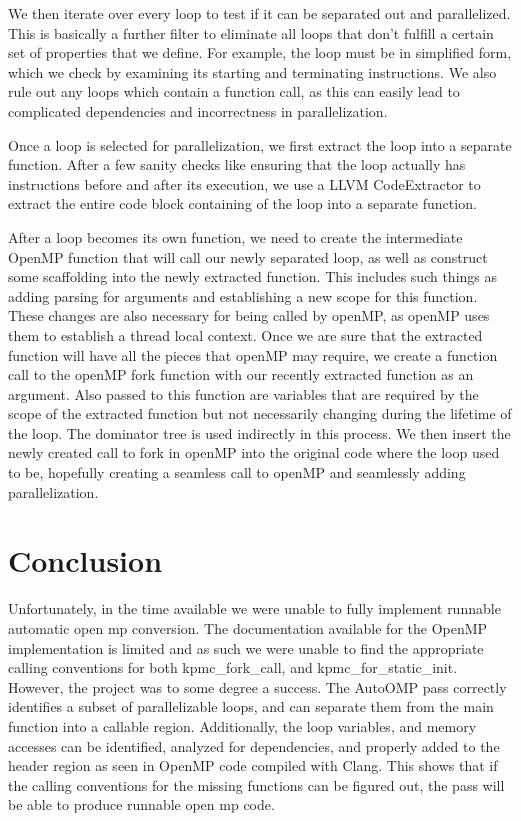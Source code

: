 \documentclass[conference]{IEEEtran}
\begin{document}
We then iterate over every loop to test if it can be separated out and
parallelized. This is basically a further filter to eliminate all
loops that don't fulfill a certain set of properties that we
define. For example, the loop must be in simplified form, which we
check by examining its starting and terminating instructions. We also
rule out any loops which contain a function call, as this can easily
lead to complicated dependencies and incorrectness in parallelization.

Once a loop is selected for parallelization, we first extract the loop
into a separate function. After a few sanity checks like ensuring that
the loop actually has instructions before and after its execution, we
use a LLVM CodeExtractor to extract the entire code block containing
of the loop into a separate function.

After a loop becomes its own function, we need to create the
intermediate OpenMP function that will call our newly separated loop,
as well as construct some scaffolding into the newly extracted
function. This includes such things as adding parsing for arguments
and establishing a new scope for this function. These changes are also
necessary for being called by openMP, as openMP uses them to establish
a thread local context. Once we are sure that the extracted function
will have all the pieces that openMP may require, we create a function
call to the openMP fork function with our recently extracted function
as an argument. Also passed to this function are variables that are
required by the scope of the extracted function but not necessarily
changing during the lifetime of the loop. The dominator tree is used
indirectly in this process. We then insert the newly created call to
fork in openMP into the original code where the loop used to be,
hopefully creating a seamless call to openMP and seamlessly adding
parallelization.




\section{Conclusion}

Unfortunately, in the time available we were unable to fully implement runnable automatic
open mp conversion. The documentation available for the OpenMP implementation is limited
and as such we were unable to find the appropriate calling conventions for both
kpmc_fork_call, and kpmc_for_static_init. However, the project was to some degree a success.
The AutoOMP pass correctly identifies a subset of parallelizable loops, and can separate them
from the main function into a callable region. Additionally, the loop variables, and memory accesses
can be identified, analyzed for dependencies, and properly added to the header region as seen in 
OpenMP code compiled with Clang. This shows that if the calling conventions for the missing 
functions can be figured out, the pass will be able to produce runnable open mp code. 
\end{document}
